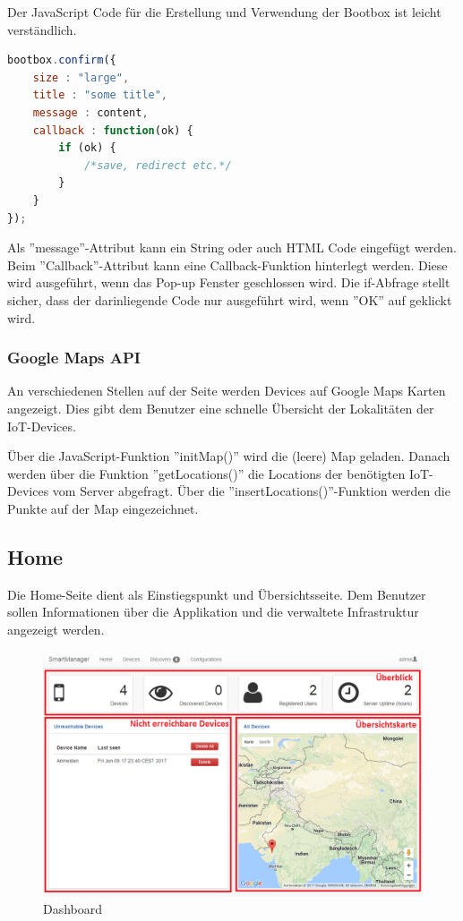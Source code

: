 Der JavaScript Code für die Erstellung und Verwendung der Bootbox ist leicht verständlich.

\begin{lstlisting}[language=js]
bootbox.confirm({
	size : "large",
	title : "some title",
	message : content,
	callback : function(ok) {
		if (ok) {
			/*save, redirect etc.*/		
		}
	}
});
\end{lstlisting} 

Als ''message''-Attribut kann ein String oder auch HTML Code eingefügt werden.  Beim ''Callback''-Attribut kann eine Callback-Funktion hinterlegt werden. Diese wird ausgeführt, wenn das Pop-up Fenster geschlossen wird. Die if-Abfrage stellt sicher, dass der darinliegende Code nur ausgeführt wird, wenn ''OK'' auf geklickt wird.
 \newpage


\subsubsection{Google Maps API}
An verschiedenen Stellen auf der Seite werden Devices auf Google Maps Karten angezeigt. Dies gibt dem Benutzer eine schnelle Übersicht der Lokalitäten der IoT-Devices.

Über die JavaScript-Funktion ''initMap()'' wird die (leere) Map geladen. Danach werden über die Funktion ''getLocations()'' die Locations der benötigten IoT-Devices vom Server abgefragt. Über die ''insertLocations()''-Funktion werden die Punkte auf der Map eingezeichnet.

\subsection{Home}
Die Home-Seite dient als Einstiegspunkt und Übersichtsseite. Dem Benutzer sollen Informationen über die Applikation und die verwaltete Infrastruktur angezeigt werden.

\begin{figure}[H]
\centering
\includegraphics[scale=0.57]{../04_Realisierung/images/userinterface/home.png}
\caption{Dashboard}
\end{figure}

